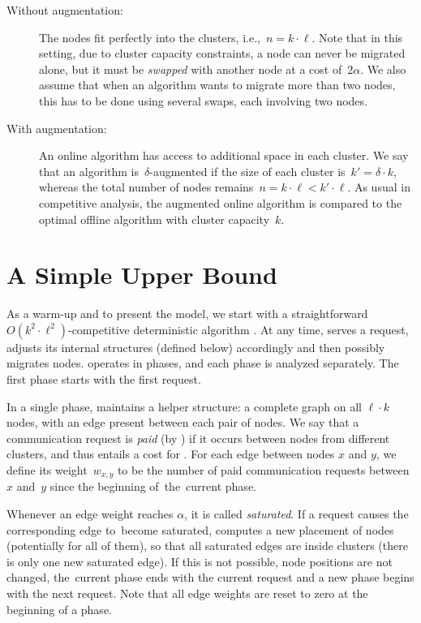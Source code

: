 \begin{description}

\item[Without augmentation:] The nodes fit perfectly into the clusters,
i.e.,~$n=k\cdot \ell$. Note that in this setting, due to cluster capacity
constraints, a node can never be migrated alone, but it must be \emph{swapped}
with another node at a cost of~$2\alpha$. We also assume that when an
algorithm wants to migrate more than two nodes, this has to be done using
several swaps, each involving two nodes.

\item[With augmentation:] An online algorithm has access to additional space
in each cluster. We say that an algorithm is~$\delta$-augmented if the size of
each cluster is~$k' = \delta \cdot k$, whereas the total number of nodes
remains~$n = k\cdot \ell < k'\cdot \ell$. As usual in competitive analysis,
the augmented online algorithm is compared to the optimal offline algorithm
with cluster capacity~$k$.
\end{description}


\section{A Simple Upper Bound}
\label{sec:upper}

As a warm-up and to present the model, we start with a straightforward $O(k^2
\cdot \ell^2)$-competitive deterministic algorithm \DET. At any time, \DET
serves a request, adjusts its internal structures (defined below)
accordingly and then possibly migrates nodes. \DET operates in phases, and each
phase is analyzed separately. The first phase starts with the first request.

In a single phase, \DET maintains a helper structure: a complete graph on all
$\ell \cdot k$ nodes, with an edge present between each pair of nodes. We say
that a communication request is \emph{paid} (by \DET) if it occurs between
nodes from different clusters, and thus entails a cost for \DET. For each edge
between nodes $x$ and $y$, we define its weight~$w_{x,y}$ to be the number of
paid communication requests between $x$ and~$y$ since the beginning of~the~current phase.

Whenever an edge weight reaches $\alpha$, it is called \emph{saturated}. If a
request causes the corresponding edge to~become saturated,
\DET computes a new placement of nodes (potentially for all of them), so that all
saturated edges are inside clusters (there is only one new saturated edge). If
this is not possible, node positions are not changed, the~current phase ends
with the current request and a new phase begins with the next request. Note
that all edge weights are reset to zero at the beginning of a phase.


